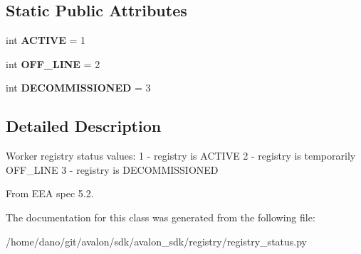 \subsection*{Static Public Attributes}
\begin{DoxyCompactItemize}
\item 
\mbox{\label{classavalon__sdk_1_1registry_1_1registry__status_1_1RegistryStatus_ac13b8246cb1d878e5574a34937851c86}} 
int {\bfseries A\+C\+T\+I\+VE} = 1
\item 
\mbox{\label{classavalon__sdk_1_1registry_1_1registry__status_1_1RegistryStatus_a9defb5815d9976e25d4e0b110b96ae6e}} 
int {\bfseries O\+F\+F\+\_\+\+L\+I\+NE} = 2
\item 
\mbox{\label{classavalon__sdk_1_1registry_1_1registry__status_1_1RegistryStatus_ad72103b08ef86b187df26d1cae57ad12}} 
int {\bfseries D\+E\+C\+O\+M\+M\+I\+S\+S\+I\+O\+N\+ED} = 3
\end{DoxyCompactItemize}


\subsection{Detailed Description}
\begin{DoxyVerb}Worker registry status values:
1 - registry is ACTIVE
2 - registry is temporarily OFF_LINE
3 - registry is DECOMMISSIONED

From EEA spec 5.2.
\end{DoxyVerb}
 

The documentation for this class was generated from the following file\+:\begin{DoxyCompactItemize}
\item 
/home/dano/git/avalon/sdk/avalon\+\_\+sdk/registry/registry\+\_\+status.\+py\end{DoxyCompactItemize}
